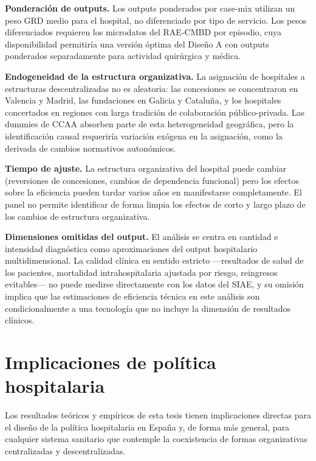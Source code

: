 \documentclass[12pt, a4paper, twoside, openright]{book}
\theoremstyle{plain}
\theoremstyle{definition}
\theoremstyle{remark}
\begin{document}
\textbf{Ponderación de outputs.} Los outputs ponderados por case-mix utilizan un peso GRD medio para el hospital, no diferenciado por tipo de servicio. Los pesos diferenciados requieren los microdatos del RAE-CMBD por episodio, cuya disponibilidad permitiría una versión óptima del Diseño A con outputs ponderados separadamente para actividad quirúrgica y médica.

\textbf{Endogeneidad de la estructura organizativa.} La asignación de hospitales a estructuras descentralizadas no es aleatoria: las concesiones se concentraron en Valencia y Madrid, las fundaciones en Galicia y Cataluña, y los hospitales concertados en regiones con larga tradición de colaboración público-privada. Las dummies de CCAA absorben parte de esta heterogeneidad geográfica, pero la identificación causal requeriría variación exógena en la asignación, como la derivada de cambios normativos autonómicos.

\textbf{Tiempo de ajuste.} La estructura organizativa del hospital puede cambiar (reversiones de concesiones, cambios de dependencia funcional) pero los efectos sobre la eficiencia pueden tardar varios años en manifestarse completamente. El panel no permite identificar de forma limpia los efectos de corto y largo plazo de los cambios de estructura organizativa.

\textbf{Dimensiones omitidas del output.} El análisis se centra en cantidad e intensidad diagnóstica como aproximaciones del output hospitalario multidimensional. La calidad clínica en sentido estricto ---resultados de salud de los pacientes, mortalidad intrahospitalaria ajustada por riesgo, reingresos evitables--- no puede medirse directamente con los datos del SIAE, y su omisión implica que las estimaciones de eficiencia técnica en este análisis son condicionalmente a una tecnología que no incluye la dimensión de resultados clínicos.



\chapter{Implicaciones de política hospitalaria}
\label{ch:politica}

Los resultados teóricos y empíricos de esta tesis tienen implicaciones directas para el diseño de la política hospitalaria en España y, de forma más general, para cualquier sistema sanitario que contemple la coexistencia de formas organizativas centralizadas y descentralizadas.
\end{document}
